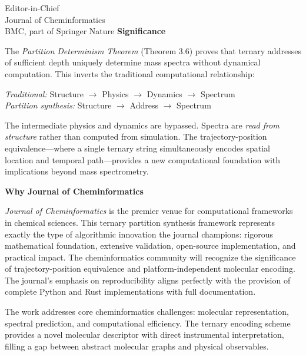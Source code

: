 \documentclass[11pt,letterpaper]{letter}
\begin{document}
\begin{letter}{
    Editor-in-Chief \\
    Journal of Cheminformatics \\
    BMC, part of Springer Nature
}
\textbf{Significance}

\vspace{0.2cm}

The \textit{Partition Determinism Theorem} (Theorem 3.6) proves that ternary addresses of sufficient depth uniquely determine mass spectra without dynamical computation. This inverts the traditional computational relationship:

\vspace{0.2cm}

\begin{center}
\textit{Traditional:} Structure $\rightarrow$ Physics $\rightarrow$ Dynamics $\rightarrow$ Spectrum \\
\textit{Partition synthesis:} Structure $\rightarrow$ Address $\rightarrow$ Spectrum
\end{center}

\vspace{0.2cm}

The intermediate physics and dynamics are bypassed. Spectra are \textit{read from structure} rather than computed from simulation. The trajectory-position equivalence---where a single ternary string simultaneously encodes spatial location and temporal path---provides a new computational foundation with implications beyond mass spectrometry.

\vspace{0.3cm}

\textbf{Why Journal of Cheminformatics}

\vspace{0.2cm}

\textit{Journal of Cheminformatics} is the premier venue for computational frameworks in chemical sciences. This ternary partition synthesis framework represents exactly the type of algorithmic innovation the journal champions: rigorous mathematical foundation, extensive validation, open-source implementation, and practical impact. The cheminformatics community will recognize the significance of trajectory-position equivalence and platform-independent molecular encoding. The journal's emphasis on reproducibility aligns perfectly with the provision of complete Python and Rust implementations with full documentation.

\vspace{0.2cm}

The work addresses core cheminformatics challenges: molecular representation, spectral prediction, and computational efficiency. The ternary encoding scheme provides a novel molecular descriptor with direct instrumental interpretation, filling a gap between abstract molecular graphs and physical observables.


\end{letter}
\end{document}
